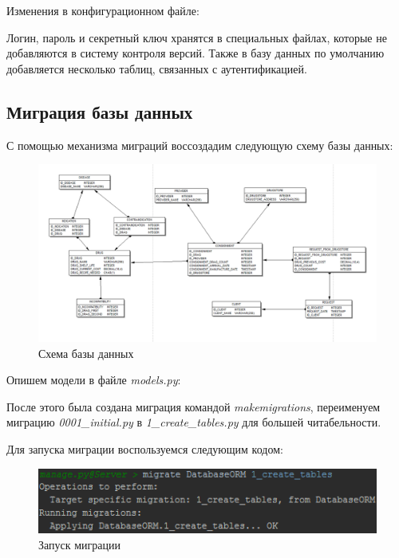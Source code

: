 \documentclass[14pt,a4paper,report]{report}
\begin{document}
Изменения в конфигурационном файле:



Логин, пароль и секретный ключ хранятся в специальных файлах, которые не добавляются в систему контроля версий. Также в базу данных по умолчанию добавляется несколько таблиц, связанных с аутентификацией.

\subsection{Миграция базы данных}

С помощью механизма миграций воссоздадим следующую схему базы данных:

\begin{figure}[h!]
	\centering
	\includegraphics[scale = 0.50]{images/2.png}
	\caption{Схема базы данных}
	\label{image:2}
\end{figure}

Опишем модели в файле \emph{models.py}:



После этого была создана миграция командой \emph{makemigrations}, переименуем миграцию \emph{0001\_initial.py} в \emph{1\_create\_tables.py} для большей читабельности.

Для запуска миграции воспользуемся следующим кодом:

\begin{figure}[h!]
	\centering
	\includegraphics[scale = 0.95]{images/3.png}
	\caption{Запуск миграции}
	\label{image:3}
\end{figure}
\end{document}
